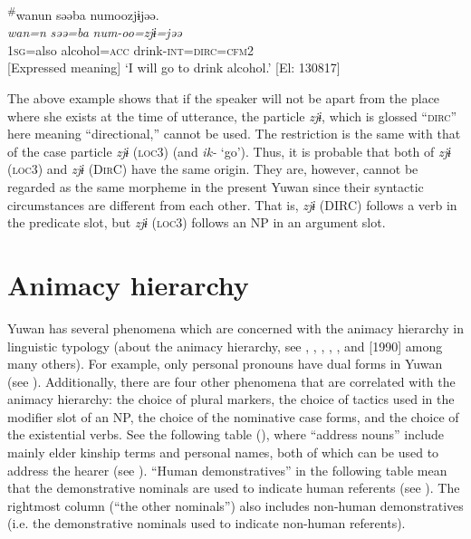 {\TM}
\glll \textsuperscript{\#}wanun  səəba  numoozjɨjəə.\\
\textit{wan=n}  \textit{səə=ba}  \textit{num-oo=zjɨ=jəə}\\
    1\textsc{sg}=also  alcohol=\textsc{acc}  drink-\textsc{int}=\textsc{dirc}=\textsc{cfm}2\\
    {}[Expressed meaning] ‘I will go to drink alcohol.’ [El: 130817]
    \z

The above example shows that if the speaker will not be apart from the place where she exists at the time of utterance, the particle \textit{zjɨ}, which is glossed “\textsc{dirc}” here meaning “directional,” cannot be used. The restriction is the same with that of the case particle \textit{zjɨ} (\textsc{loc3}) (and \textit{ik-} ‘go’). Thus, it is probable that both of \textit{zjɨ} (\textsc{loc3}) and \textit{zjɨ} (D\textsc{ir}C) have the same origin. They are, however, cannot be regarded as the same morpheme in the present Yuwan since their syntactic circumstances are different from each other. That is, \textit{zjɨ} (DIRC) follows a verb in the predicate slot, but \textit{zjɨ} (\textsc{loc3}) follows an NP in an argument slot.

\section{Animacy hierarchy}

Yuwan has several phenomena which are concerned with the animacy hierarchy in linguistic typology (about the animacy hierarchy, see \citealt{Silverstein1976}, \citealt{Comrie1989}, \citealt{Dixon1994}, \citealt{Whaley1997}, \citealt{Corbett2000}, and \citealt{Croft2003} [1990] among many others). For example, only personal pronouns have dual forms in Yuwan (see ). Additionally, there are four other phenomena that are correlated with the animacy hierarchy: the choice of plural markers, the choice of tactics used in the modifier slot of an NP, the choice of the nominative case forms, and the choice of the existential verbs. See the following table (), where “address nouns” include mainly elder kinship terms and personal names, both of which can be used to address the hearer (see ). “Human demonstratives” in the following table mean that the demonstrative nominals are used to indicate human referents (see ). The rightmost column (“the other nominals”) also includes non-human demonstratives (i.e. the demonstrative nominals used to indicate non-human referents).

